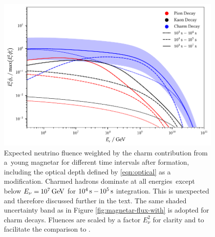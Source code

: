 \begin{figure}[H]
	\centering
	\includegraphics{../plots/build/magnetar_integrated_neutrino_spectrum_with.pdf}
	\caption[Magnetar $\nu \kern+0.5pt$ fluence compared to $c$ decay with optical depth.]
			{Expected neutrino fluence weighted by the charm contribution from a~young magnetar for different time
			 intervals after formation, including the optical depth defined by \eqref{eqn:optical} as a modification.
			 Charmed hadrons dominate at all energies~except below $E_\nu = \kern-0.5pt \qty{e7}{\giga\electronvolt}$ for
			 $\qty{e4}{\second} - \kern-1.0pt \qty{e5}{\second}$ integration. This is unexpected and therefore discussed further
			 in the text. The same shaded uncertainty band as in Figure \ref{fig:magnetar-flux-with} is adopted for charm decays.
			 Fluences are scaled by a factor $E_\nu^2$ for clarity and to facilitate the comparison to \cite{Carpio_2020}.}
	\label{fig:magnetar-fluence-with}
\end{figure}

